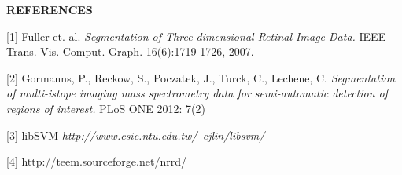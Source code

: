 \documentclass{article}
\begin{document}
\begin{center}\LARGE{\textbf{REFERENCES}}\end{center} 
\vfill


	[1]  Fuller et. al. \textit{Segmentation of Three-dimensional Retinal Image Data.} 
	IEEE Trans. Vis. Comput. Graph. 16(6):1719-1726, 2007.

	[2] Gormanns, P., Reckow, S., Poczatek, J., Turck, C., Lechene, C. \textit{Segmentation of multi-istope imaging mass spectrometry data for semi-automatic detection of regions of interest.} PLoS ONE 2012: 7(2)

	[3] libSVM  \textit{http://www.csie.ntu.edu.tw/~cjlin/libsvm/}
	
	[4] http://teem.sourceforge.net/nrrd/
\end{document}
